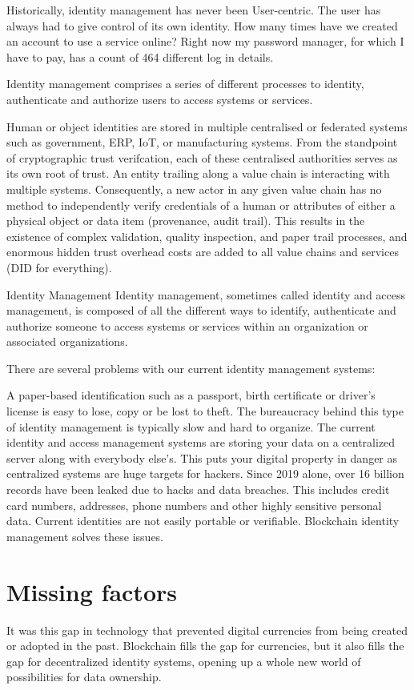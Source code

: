 
Historically, identity management has never been User-centric. The user has always had to give control of its own identity. 
How many times have we created an account to use a service online? Right now my password manager, for which I have to pay, has a count of 464 different log in details. 
 
Identity management comprises a series of different processes to identity, authenticate and authorize users to access systems or services. 
 
Human or object identities are stored in multiple centralised or federated systems such as government, ERP, IoT,
or manufacturing systems. From the standpoint of cryptographic trust verifcation, each of these centralised
authorities serves as its own root of trust.
An entity trailing along a value chain is interacting with multiple systems. Consequently, a new actor in any given value chain has no method to independently verify credentials of a human or attributes of either a physical object or data item (provenance, audit trail). This results in the existence of complex validation, quality inspection, and paper trail processes, and enormous hidden trust overhead costs are added to all value chains and services (DID for everything).
 
Identity Management
Identity management, sometimes called identity and access management, is composed of all the different ways to identify, authenticate and authorize someone to access systems or services within an organization or associated organizations. 

There are several problems with our current identity management systems:

A paper-based identification such as a passport, birth certificate or driver’s license is easy to lose, copy or be lost to theft.
The bureaucracy behind this type of identity management is typically slow and hard to organize.
The current identity and access management systems are storing your data on a centralized server along with everybody else’s. This puts your digital property in danger as centralized systems are huge targets for hackers.
Since 2019 alone, over 16 billion records have been leaked due to hacks and data breaches. This includes credit card numbers, addresses, phone numbers and other highly sensitive personal data.
Current identities are not easily portable or verifiable.
Blockchain identity management solves these issues. 


 

\section{Missing factors}
It was this gap in technology that prevented digital currencies from being created or adopted in the past. Blockchain fills the gap for currencies, but it also fills the gap for decentralized identity systems, opening up a whole new world of possibilities for data ownership.

